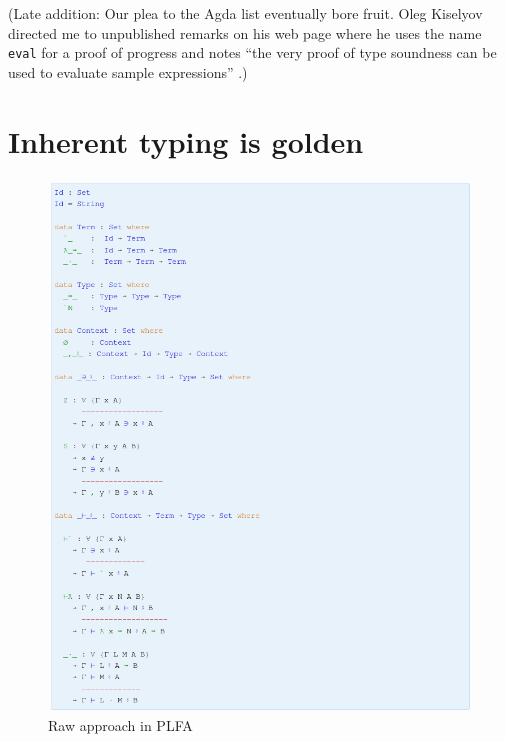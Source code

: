 \documentclass[preprint,authoryear]{elsarticle}
\begin{document}
(Late addition: Our plea to the Agda list eventually bore fruit.  Oleg
Kiselyov directed me to unpublished remarks on his web page where he
uses the name \texttt{eval} for a proof of progress and notes ``the
very proof of type soundness can be used to evaluate sample
expressions'' \citep{Kiselyov-2009}.)


\section{Inherent typing is golden}

\begin{figure}[p]
  \includegraphics[width=\textwidth]{figures/raw.png}
  \caption{Raw approach in PLFA}
  \label{fig:raw}
\end{figure}  
\end{document}

